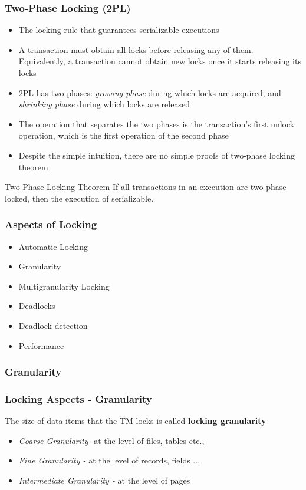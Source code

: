 \documentclass[12]{beamer}
\begin{document}
\begin{frame}
  \frametitle{Two-Phase Locking (2PL) }
  \begin{itemize}
  \item The locking rule that guarantees serializable executions
  \item A transaction must obtain all locks before releasing any of them. Equivalently, a transaction cannot obtain new locks once it starts releasing its locks
  \item 2PL has two phases: \textit{growing phase} during which locks are acquired, and \textit{shrinking phase} during which locks are released
  \item The operation that separates the two phases is the transaction's first unlock operation, which is the first operation of the second phase
  \item Despite the simple intuition, there are no simple proofs of two-phase locking theorem
  \end{itemize}
   \begin{block}{Two-Phase Locking Theorem}
     If all transactions in an execution are two-phase locked, then the execution of serializable.
  \end{block}
\end{frame}

\begin{frame}
  \frametitle{Aspects of Locking}
  \begin{itemize}
	\item Automatic Locking
	\item Granularity
	\item Multigranularity Locking
	\item Deadlocks
	\item Deadlock detection
	\item Performance
  \end{itemize}
\end{frame}

\subsubsection{Granularity}

\begin{frame}
  \frametitle{Locking Aspects - Granularity}
  \begin{definition}The size of data items that the TM locks is called \textbf{locking granularity}\end{definition}
  \begin{itemize}
   \addtolength{\itemsep}{1.0\baselineskip}
    \item \textit{Coarse Granularity-} at the level of files, tables etc.,
    \item \textit{Fine Granularity -} at the level of records, fields ...
    \item \textit{Intermediate Granularity -} at the level of pages
  \end{itemize}
\end{frame}
\end{document}
